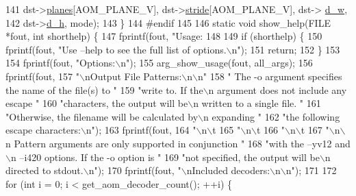 \begin{DoxyCodeInclude}
141                    dst->\hyperlink{structaom__image_ac54dbc5237ca2914f9ec30105dfbe302}{planes}[AOM\_PLANE\_V], dst->\hyperlink{structaom__image_a6dc693d7dbc9eb06c0cdde307ca58372}{stride}[AOM\_PLANE\_V], dst->
      \hyperlink{structaom__image_a89f80b1f58d608b9d2080635f4359034}{d\_w},
142                    dst->\hyperlink{structaom__image_ab986419a1f0fff93a2dc505f47194988}{d\_h}, mode);
143 \}
144 \textcolor{preprocessor}{#endif}
145 
146 \textcolor{keyword}{static} \textcolor{keywordtype}{void} show\_help(FILE *fout, \textcolor{keywordtype}{int} shorthelp) \{
147   fprintf(fout, \textcolor{stringliteral}{"Usage: %
148 
149   \textcolor{keywordflow}{if} (shorthelp) \{
150     fprintf(fout, \textcolor{stringliteral}{"Use --help to see the full list of options.\(\backslash\)n"});
151     \textcolor{keywordflow}{return};
152   \}
153 
154   fprintf(fout, \textcolor{stringliteral}{"Options:\(\backslash\)n"});
155   arg\_show\_usage(fout, all\_args);
156   fprintf(fout,
157           \textcolor{stringliteral}{"\(\backslash\)nOutput File Patterns:\(\backslash\)n\(\backslash\)n"}
158           \textcolor{stringliteral}{"  The -o argument specifies the name of the file(s) to "}
159           \textcolor{stringliteral}{"write to. If the\(\backslash\)n  argument does not include any escape "}
160           \textcolor{stringliteral}{"characters, the output will be\(\backslash\)n  written to a single file. "}
161           \textcolor{stringliteral}{"Otherwise, the filename will be calculated by\(\backslash\)n  expanding "}
162           \textcolor{stringliteral}{"the following escape characters:\(\backslash\)n"});
163   fprintf(fout,
164           \textcolor{stringliteral}{"\(\backslash\)n\(\backslash\)t%
165           \textcolor{stringliteral}{"\(\backslash\)n\(\backslash\)t%
166           \textcolor{stringliteral}{"\(\backslash\)n\(\backslash\)t%
167           \textcolor{stringliteral}{"\(\backslash\)n\(\backslash\)n  Pattern arguments are only supported in conjunction "}
168           \textcolor{stringliteral}{"with the --yv12 and\(\backslash\)n  --i420 options. If the -o option is "}
169           \textcolor{stringliteral}{"not specified, the output will be\(\backslash\)n  directed to stdout.\(\backslash\)n"});
170   fprintf(fout, \textcolor{stringliteral}{"\(\backslash\)nIncluded decoders:\(\backslash\)n\(\backslash\)n"});
171 
172   \textcolor{keywordflow}{for} (\textcolor{keywordtype}{int} i = 0; i < get\_aom\_decoder\_count(); ++i) \{
}}}}
\end{DoxyCodeInclude}
